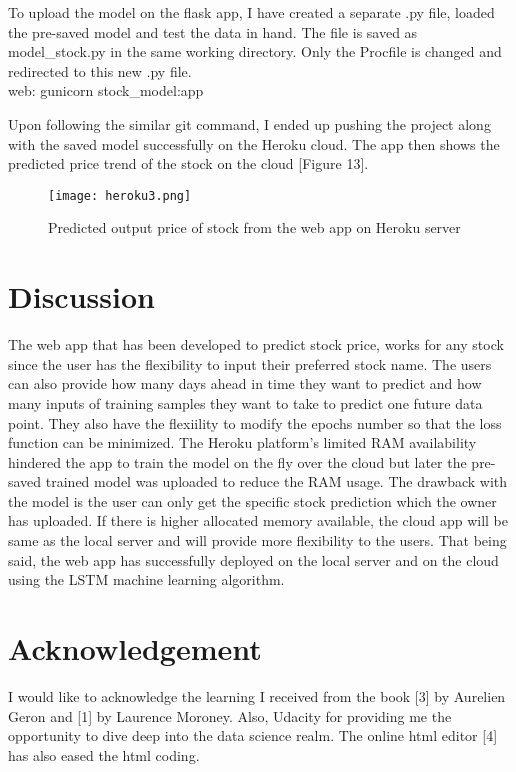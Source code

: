 \documentclass[11pt]{diazessay} %
\begin{document}
To upload the model on the flask app, I have created a separate .py file, loaded the pre-saved model and test the data in hand. The file is saved as model\_stock.py in the same working directory. Only the Procfile is changed and redirected to this new .py file.\\

{\selectfont
\noindent web: gunicorn stock\_model:app\\
}

Upon following the similar git command, I ended up pushing the project along with the saved model successfully on the Heroku cloud. The app then shows the predicted price trend of the stock on the cloud [Figure 13].

\begin{figure}[!h]
\begin{center}
\texttt{[image: heroku3.png]} %
\caption{Predicted output price of stock from the web app on Heroku server}
\end{center}
\end{figure}

\section{Discussion}
The web app that has been developed to predict stock price, works for any stock since the user has the flexibility to input their preferred stock name. The users can also provide how many days ahead in time they want to predict and how many inputs of  training samples they want to take to predict one future data point. They also have the flexiility to modify the epochs number so that the loss function can be minimized. The Heroku platform's limited RAM availability hindered the app to train the model on the fly over the cloud but later the pre-saved trained model was uploaded to reduce the RAM usage. The drawback with the model is the user can only get the specific stock prediction which the owner has uploaded. If there is higher allocated memory available, the cloud app will be same as the local server and will provide more flexibility to the users. That being said, the web app has successfully deployed on the local server and on the cloud using the LSTM machine learning algorithm.        


\section{Acknowledgement}
I would like to acknowledge the learning I received from the book [3] by Aurelien Geron and [1] by Laurence Moroney. Also, Udacity for providing me the opportunity to dive deep into the data science realm. The online html editor [4] has also eased the html coding.
\end{document}
